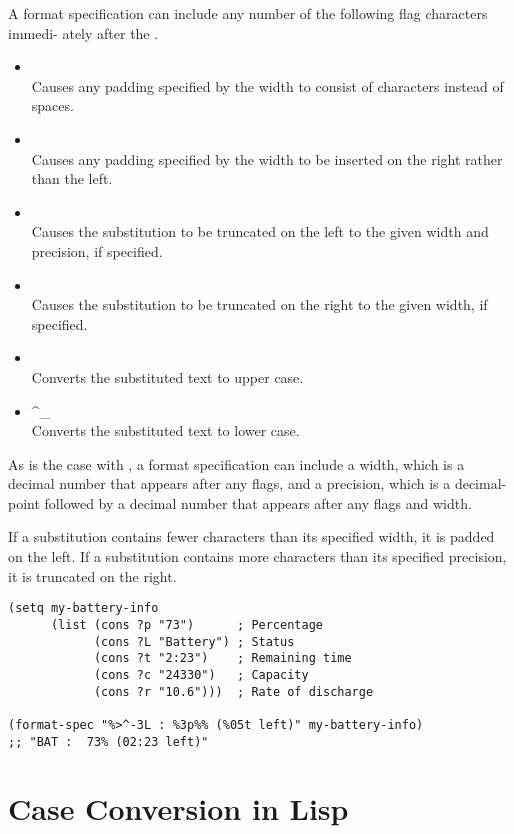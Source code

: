 A format specification can include any number of the following flag characters immedi- ately after the \argument{\%}.
\begin{itemize}
\item {}\\
  Causes any padding specified by the width to consist of  characters instead of spaces.
\item \argument{-}\\
  Causes any padding specified by the width to be inserted on the right rather than the left.
\item \argument{<}\\
  Causes the substitution to be truncated on the left to the given width and precision, if specified.
\item \argument{>}\\
  Causes the substitution to be truncated on the right to the given width, if specified.
\item \argument{\textasciicircum{}}\\
  Converts the substituted text to upper case.
\item \textasciicircum{\_}\\
  Converts the substituted text to lower case.
\end{itemize}

As is the case with , a format specification can include a width, which is a decimal number that appears after any flags, and a precision, which is a decimal-point  followed by a decimal number that appears after any flags and width.


If a substitution contains fewer characters than its specified width, it is padded on the left.
If a substitution contains more characters than its specified precision, it is truncated on the right.

\begin{lstlisting}
(setq my-battery-info
      (list (cons ?p "73")      ; Percentage
            (cons ?L "Battery") ; Status
            (cons ?t "2:23")    ; Remaining time
            (cons ?c "24330")   ; Capacity
            (cons ?r "10.6")))  ; Rate of discharge

(format-spec "%>^-3L : %3p%% (%05t left)" my-battery-info)
;; "BAT :  73% (02:23 left)"
\end{lstlisting}


\section{Case Conversion in Lisp}
\label{sec:case-conversion-lisp}

